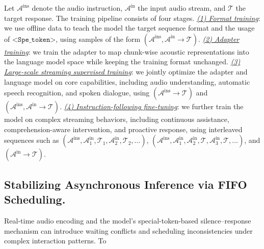 \documentclass{llmxive}
\begin{document}
Let $\mathcal{A}^{\mathrm{ins}}$ denote the audio instruction, $\mathcal{A}^{\mathrm{in}}$ the input audio stream, and $\mathcal{T}$ the target response. The training pipeline consists of four stages. \underline{\textit{(1) Format training}}: we use offline data to teach the model the target sequence format and the usage of $\texttt{<Spe\_token>}$, using samples of the form $(\mathcal{A}^{\mathrm{ins}}, \mathcal{A}^{\mathrm{in}} \rightarrow \mathcal{T})$. \underline{\textit{(2) Adapter training}}: we train the adapter to map chunk-wise acoustic representations into the language model space while keeping the training format unchanged. \underline{\textit{(3) Large-scale streaming supervised training}}: we jointly optimize the adapter and language model on core capabilities, including audio understanding, automatic speech recognition, and spoken dialogue, using $(\mathcal{A}^{\mathrm{ins}} \rightarrow \mathcal{T})$ and $(\mathcal{A}^{\mathrm{ins}}, \mathcal{A}^{\mathrm{in}} \rightarrow \mathcal{T})$. \underline{\textit{(4) Instruction-following fine-tuning}}: we further train the model on complex streaming behaviors, including continuous assistance, comprehension-aware intervention, and proactive response, using interleaved sequences such as $(\mathcal{A}^{\mathrm{ins}}, \mathcal{A}^{\mathrm{in}}_1, \mathcal{T}_1, \mathcal{A}^{\mathrm{in}}_2, \mathcal{T}_2, \ldots)$, $(\mathcal{A}^{\mathrm{ins}}, \mathcal{A}^{\mathrm{in}}_1, \mathcal{A}^{\mathrm{in}}_2, \mathcal{T}, \mathcal{A}^{\mathrm{in}}_3, \mathcal{T}, \ldots)$, and $(\mathcal{A}^{\mathrm{in}} \rightarrow \mathcal{T})$.


\subsection{Stabilizing Asynchronous Inference via FIFO Scheduling.}
\vspace{-2mm}

Real-time audio encoding and the model's special-token-based silence--response mechanism can introduce waiting conflicts and scheduling inconsistencies under complex interaction patterns. To
\end{document}
